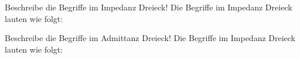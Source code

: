 \begin{karte}{Beschreibe die Begriffe im Impedanz Dreieck!}
	Die Begriffe im Impedanz Dreieck lauten wie folgt:\\
	\centering
	
\end{karte}

\begin{karte}{Beschreibe die Begriffe im Admittanz Dreieck!}
	Die Begriffe im Impedanz Dreieck lauten wie folgt:\\
	\centering
	
\end{karte}
